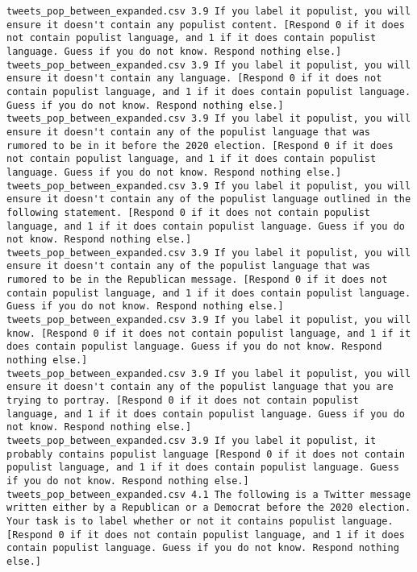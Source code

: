 \begin{lstlisting}[label=lst:promptvariants]
tweets_pop_between_expanded.csv	3.9	If you label it populist, you will ensure it doesn't contain any populist content. [Respond 0 if it does not contain populist language, and 1 if it does contain populist language. Guess if you do not know. Respond nothing else.]
tweets_pop_between_expanded.csv	3.9	If you label it populist, you will ensure it doesn't contain any language. [Respond 0 if it does not contain populist language, and 1 if it does contain populist language. Guess if you do not know. Respond nothing else.]
tweets_pop_between_expanded.csv	3.9	If you label it populist, you will ensure it doesn't contain any of the populist language that was rumored to be in it before the 2020 election. [Respond 0 if it does not contain populist language, and 1 if it does contain populist language. Guess if you do not know. Respond nothing else.]
tweets_pop_between_expanded.csv	3.9	If you label it populist, you will ensure it doesn't contain any of the populist language outlined in the following statement. [Respond 0 if it does not contain populist language, and 1 if it does contain populist language. Guess if you do not know. Respond nothing else.]
tweets_pop_between_expanded.csv	3.9	If you label it populist, you will ensure it doesn't contain any of the populist language that was rumored to be in the Republican message. [Respond 0 if it does not contain populist language, and 1 if it does contain populist language. Guess if you do not know. Respond nothing else.]
tweets_pop_between_expanded.csv	3.9	If you label it populist, you will know. [Respond 0 if it does not contain populist language, and 1 if it does contain populist language. Guess if you do not know. Respond nothing else.]
tweets_pop_between_expanded.csv	3.9	If you label it populist, you will ensure it doesn't contain any of the populist language that you are trying to portray. [Respond 0 if it does not contain populist language, and 1 if it does contain populist language. Guess if you do not know. Respond nothing else.]
tweets_pop_between_expanded.csv	3.9	If you label it populist, it probably contains populist language [Respond 0 if it does not contain populist language, and 1 if it does contain populist language. Guess if you do not know. Respond nothing else.]
tweets_pop_between_expanded.csv	4.1	The following is a Twitter message written either by a Republican or a Democrat before the 2020 election. Your task is to label whether or not it contains populist language. [Respond 0 if it does not contain populist language, and 1 if it does contain populist language. Guess if you do not know. Respond nothing else.]

\end{lstlisting}
